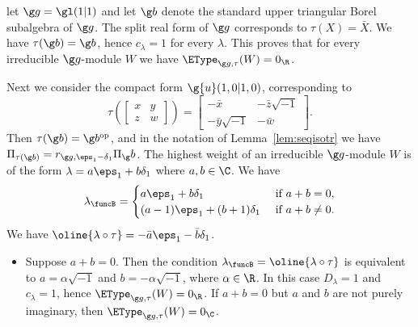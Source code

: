 \documentclass[12pt]{amsart}
\begin{document}
\begin{ex}
\label{ex-gl11}
let $\g g=\gl(1|1)$ and let $\g b$ denote the standard upper triangular Borel subalgebra of $\g g$. The split real form of $\g g$ corresponds to $\tau(X)=\bar X$. We have $\tau(\g b)=\g b$, hence $c_\lambda=1$ for every $\lambda$. This proves that for every irreducible $\g g$-module $W$ we have $\EType_{\g g,\tau}(W)=0_\R$. 

Next we consider the compact form $\g{u}(1,0|1,0)$, corresponding to \[
\tau\left(\begin{bmatrix}
x & y\\z& w
\end{bmatrix}
\right)=
\begin{bmatrix}
-\bar x & -\bar z\sqrt{-1}\\-\bar y\sqrt{-1}& -\bar w
\end{bmatrix}
.\]  Then $\tau(\g b)=\g b^\mathrm{op}$, and 
in the notation of Lemma~\ref{lem:seqisotr} we have $\Pi_{\tau(\g b)}=r_{\g g,\eps_1-\delta_1}\Pi_\g b$. The highest weight of an irreducible $\g g$-module $W$ is of the form $\lambda=a\eps_1+b\delta_1$ where $a,b\in\C$. We have
\[
\lambda_\funcB=\begin{cases}
a\eps_1+b\delta_1 & \text{ if }a+b=0,\\
(a-1)\eps_1+(b+1)\delta_1& \text{ if }a+b\neq 0. 
\end{cases}
\]
We have $\oline{\lambda\circ\tau}=-\bar a \eps_1-\bar b\delta_1$.
\begin{itemize}
\item[(i)] Suppose $a+b=0$. Then the condition $\lambda_\funcB=\oline{\lambda\circ\tau}$ is equivalent to $a=\alpha\sqrt{-1}$ and $b=-\alpha\sqrt{-1}$, where $\alpha\in\R$. In this case $D_\lambda=1$ and $c_\lambda=1$, hence $\EType_{\g g,\tau}(W)=0_\R$. If $a+b=0$ but $a$ and $b$ are not purely imaginary, then $\EType_{\g g,\tau}(W)=0_\C$.


\end{itemize}
\end{ex}
\end{document}
